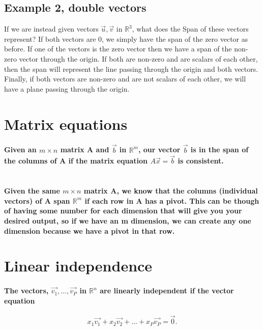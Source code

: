 \documentclass{report}
\begin{document}
\begin{multicols}{2}
\subsection{Example 2, double vectors}%
\label{sub: Example 2, double vectors }
If we are instead given vectors $ \vec{ u }, \vec{ v } \text{ in }\mathbb{R}^{ 3 } $, what does the Span of these vectors represent? If both vectors are 0, we simply have the span of the zero vector as before. If one of the vectors is the zero vector then we have a span of the non-zero vector through the origin. If both are non-zero and are scalars of each other, then the span will represent the line passing through the origin and both vectors. Finally, if both vectors are non-zero and are not scalars of each other, we will have a plane passing through the origin.

\section{Matrix equations}%
\label{sec: Matrix equations }
\paragraph{Given an $ m \times n $ matrix A and $ \vec{ b } $ in $ \mathbb{R}^{ m } $, our vector $ \vec{ b }  $ is in the span of the columns of A if the matrix equation $ A \vec{ x }= \vec{ b } $ is consistent. \\ \\}
\paragraph{Given the same $ m \times n  $ matrix A, we know that the columns (individual vectors) of A span $ \mathbb{R}^{ m } $ if each row in A has a pivot. This can be though of having some number for each dimension that will give you your desired output, so if we have an m dimension, we can create any one dimension because we have a pivot in that row. }

\section{Linear independence}%
\label{sec: Linear independence }
\paragraph{The vectors, $ \vec{ v_1 }, \ldots, \vec{ v_P } $ in $ \mathbb{R}^{ n } $ are linearly independent if the vector equation }
\[
x_1 \vec{ v_1 } + x_2 \vec{ v_2 } + \ldots + x_P \vec{ v_P } = \vec{ 0 }
.\] 

\end{multicols}
\end{document}
